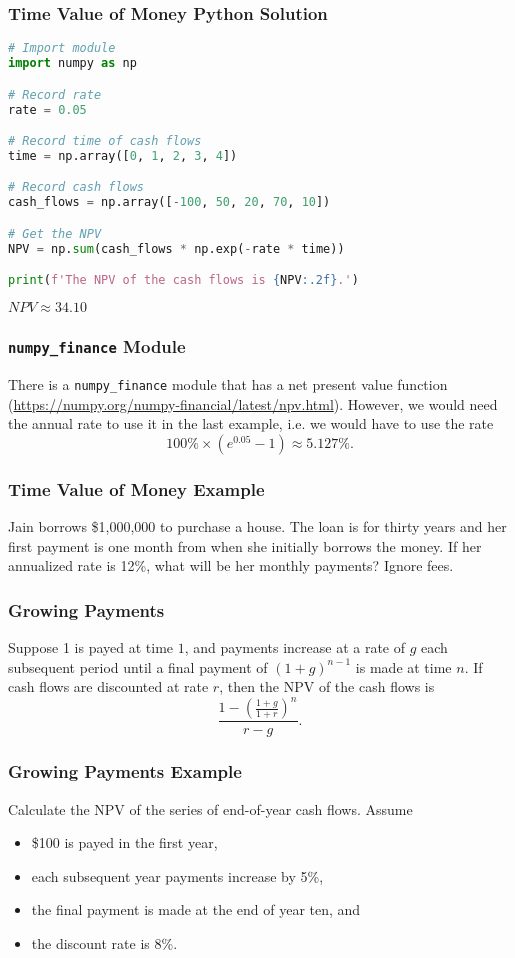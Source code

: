 \documentclass{beamer}
\begin{document}
\begin{frame}[fragile]
\frametitle{Time Value of Money Python Solution}
\begin{lstlisting}[language=Python]
# Import module
import numpy as np

# Record rate
rate = 0.05

# Record time of cash flows
time = np.array([0, 1, 2, 3, 4])

# Record cash flows
cash_flows = np.array([-100, 50, 20, 70, 10])

# Get the NPV
NPV = np.sum(cash_flows * np.exp(-rate * time))

print(f'The NPV of the cash flows is {NPV:.2f}.')
\end{lstlisting}

$NPV \approx 34.10$
\end{frame}

\begin{frame}
\frametitle{\texttt{numpy\_finance} Module}

There is a \texttt{numpy\_finance} module that has a net present value function (\url{https://numpy.org/numpy-financial/latest/npv.html}). However, we would need the annual rate to use it in the last example, i.e. we would have to use the rate 
$$
100\% \times (e^{0.05} - 1) \approx 5.127\%.
$$
\end{frame}

\begin{frame}[t]
\frametitle{Time Value of Money Example}
\small
\begin{Example}
Jain borrows \$1,000,000 to purchase a house. The loan is for thirty years and her first payment is one month from when she initially borrows the money. If her annualized rate is 12\%, what will be her monthly payments? Ignore fees.
\end{Example}

\end{frame}

\begin{frame}
\frametitle{Growing Payments}
Suppose 1 is payed at time $1$, and payments increase at a rate of $g$ each subsequent period until a final payment of $(1 + g)^{n -1}$ is made at time $n$. If cash flows are discounted at rate $r$, then the NPV of the cash flows is
$$
\frac{1 - \left(\frac{1 + g}{1 + r}\right)^n}{r - g}.
$$
\end{frame}

\begin{frame}[t]
\frametitle{Growing Payments Example}
\tiny
\begin{Example}
Calculate the NPV of the series of end-of-year cash flows. Assume 
\begin{itemize}
\item \$100 is payed in the first year,
\item each subsequent year payments increase by 5\%, 
\item the final payment is made at the end of year ten, and
\item the discount rate is 8\%.
\end{itemize} 
\end{Example}

\end{frame}
\end{document}
